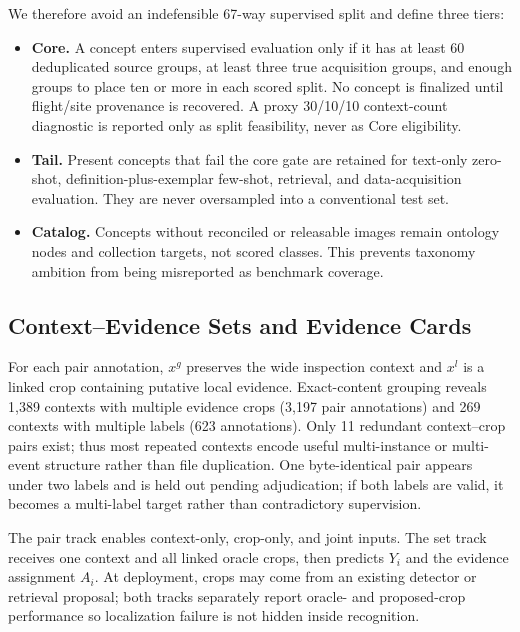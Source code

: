 

We therefore avoid an indefensible 67-way supervised split and define three tiers:
\begin{itemize}
  \item \textbf{Core.} A concept enters supervised evaluation only if it has at least 60 deduplicated source groups, at least three true acquisition groups, and enough groups to place ten or more in each scored split. No concept is finalized until flight/site provenance is recovered. A proxy 30/10/10 context-count diagnostic is reported only as split feasibility, never as Core eligibility.
  \item \textbf{Tail.} Present concepts that fail the core gate are retained for text-only zero-shot, definition-plus-exemplar few-shot, retrieval, and data-acquisition evaluation. They are never oversampled into a conventional test set.
  \item \textbf{Catalog.} Concepts without reconciled or releasable images remain ontology nodes and collection targets, not scored classes. This prevents taxonomy ambition from being misreported as benchmark coverage.
\end{itemize}



\subsection{Context--Evidence Sets and Evidence Cards}

For each pair annotation, $x^g$ preserves the wide inspection context and $x^l$ is a linked crop containing putative local evidence. Exact-content grouping reveals 1,389 contexts with multiple evidence crops (3,197 pair annotations) and 269 contexts with multiple labels (623 annotations). Only 11 redundant context--crop pairs exist; thus most repeated contexts encode useful multi-instance or multi-event structure rather than file duplication. One byte-identical pair appears under two labels and is held out pending adjudication; if both labels are valid, it becomes a multi-label target rather than contradictory supervision.

The pair track enables context-only, crop-only, and joint inputs. The set track receives one context and all linked oracle crops, then predicts $Y_i$ and the evidence assignment $A_i$. At deployment, crops may come from an existing detector or retrieval proposal; both tracks separately report oracle- and proposed-crop performance so localization failure is not hidden inside recognition.

